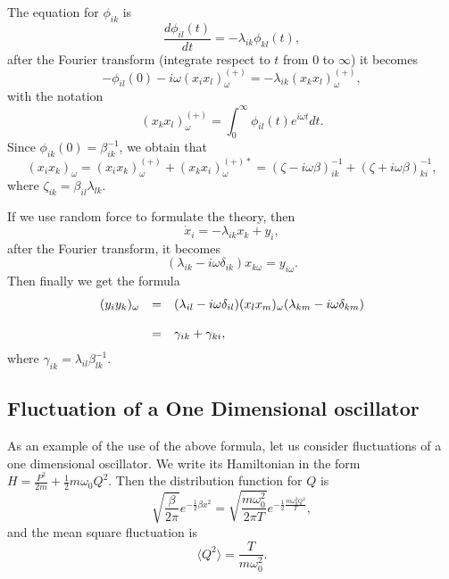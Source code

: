 \documentclass{book}
\newcommand{\average}[1]{\langle#1\rangle}
\numberwithin{equation}{section}
\begin{document}
The equation for $\phi_{ik}$ is 
\begin{equation}
  \frac{d\phi_{il}(t)}{dt}=-\lambda_{ik}\phi_{kl}(t),
\end{equation}
after the Fourier transform (integrate respect to $t$ from $0$ to
$\infty$) it becomes
\begin{equation}
  -\phi_{il}(0)-i\omega(x_ix_l)^{(+)}_\omega=-\lambda_{ik}(x_kx_l)^{(+)}_\omega,
\end{equation}
with the notation
\begin{equation}
  (x_kx_l)^{(+)}_\omega=\int_0^\infty\phi_{il}(t)e^{i\omega t}dt.
\end{equation}
Since $\phi_{ik}(0)=\beta^{-1}_{ik}$, we obtain that
\begin{equation}
  (x_ix_k)_\omega=(x_ix_k)^{(+)}_\omega+(x_kx_i)_\omega^{(+)*}=
  (\zeta-i\omega\beta)^{-1}_{ik}+(\zeta+i\omega\beta)^{-1}_{ki},
\end{equation}
where $\zeta_{ik}=\beta_{il}\lambda_{lk}$.

If we use random force to formulate the theory, then 
\begin{equation}
  \dot{x}_i=-\lambda_{ik}x_k+y_i,
\end{equation}
after the Fourier transform, it becomes
\begin{equation}
  (\lambda_{ik}-i\omega\delta_{ik})x_{k\omega}=y_{i\omega}.
\end{equation}
Then finally we get the formula
\begin{equation}
  \begin{array}{rcl}
  (y_iy_k)_\omega&=&(\lambda_{il}-i\omega\delta_{il})(x_lx_m)_\omega
  (\lambda_{km}-i\omega\delta_{km})\\\vbox to 20pt{}
  &=&\gamma_{ik}+\gamma_{ki},
  \end{array}
\end{equation}
where $\gamma_{ik}=\lambda_{il}\beta^{-1}_{lk}.$
\subsection{Fluctuation of a One Dimensional oscillator}
As an example of the use of the above formula, let us consider
fluctuations of a one dimensional oscillator. We write its Hamiltonian
in the form $H=\frac{P^2}{2m}+\frac{1}{2}m\omega_0Q^2$. Then the distribution
function for $Q$ is
\begin{equation}
  \sqrt{\frac{\beta}{2\pi}}e^{-\frac{1}{2}\beta x^2}=
  \sqrt{\frac{m\omega_0^2}{2\pi T}}e^{-\frac{1}{2}\frac{m\omega_0^2Q^2}{T}},
\end{equation}
and the mean square fluctuation is
\begin{equation}
  \average{Q^2}=\frac{T}{m\omega_0^2}.
\end{equation}
\end{document}
